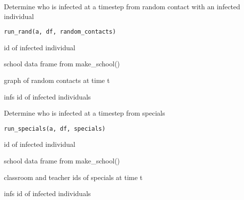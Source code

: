 \documentclass[a4paper]{book}
\begin{document}
%
\begin{Description}\relax
Determine who is infected at a timestep
from random contact with an infected individual
\end{Description}
%
\begin{Usage}
\begin{verbatim}
run_rand(a, df, random_contacts)
\end{verbatim}
\end{Usage}
%
\begin{Arguments}
\begin{ldescription}
\item[\code{a}] id of infected individual

\item[\code{df}] school data frame from make\_school()

\item[\code{random\_contacts}] graph of random contacts at time t
\end{ldescription}
\end{Arguments}
%
\begin{Value}
infs id of infected individuals
\end{Value}
%
\begin{Description}\relax
Determine who is infected at a timestep
from specials
\end{Description}
%
\begin{Usage}
\begin{verbatim}
run_specials(a, df, specials)
\end{verbatim}
\end{Usage}
%
\begin{Arguments}
\begin{ldescription}
\item[\code{a}] id of infected individual

\item[\code{df}] school data frame from make\_school()

\item[\code{specials}] classroom and teacher ids of specials at time t
\end{ldescription}
\end{Arguments}
%
\begin{Value}
infs id of infected individuals
\end{Value}
\end{document}
